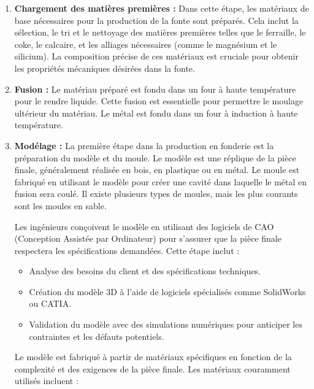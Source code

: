 \documentclass[12pt]{article}
\begin{document}
\begin{enumerate}
    \item \textbf{Chargement des matières premières :}
    Dans cette étape, les matériaux de base nécessaires pour la production de la 
    fonte sont préparés. Cela inclut la sélection, le tri et le nettoyage des 
    matières premières telles que le ferraille, le coke, le calcaire, et les alliages
    nécessaires (comme le magnésium et le silicium). La composition précise de ces 
    matériaux est cruciale pour obtenir les propriétés mécaniques désirées dans la 
    fonte.


    \item \textbf{Fusion :} Le matériau préparé est fondu dans un four à haute 
    température pour le rendre liquide. Cette fusion est essentielle pour permettre 
    le moulage ultérieur du matériau. Le métal est fondu dans un four à induction à 
    haute température. 



    \item \textbf{Modélage :} 
    La première étape dans la production en fonderie est la préparation du 
    modèle et du moule. Le modèle est une réplique de la pièce finale, 
    généralement réalisée en bois, en plastique ou en métal. 
    Le moule est fabriqué en utilisant le modèle pour créer une cavité 
    dans laquelle le métal en fusion sera coulé. Il existe plusieurs types 
    de moules, mais les plus courants sont les moules en sable.

    Les ingénieurs conçoivent le modèle en utilisant des logiciels de CAO 
(Conception Assistée par Ordinateur) pour s'assurer que la pièce finale 
respectera les spécifications demandées. Cette étape inclut :

\begin{itemize}
    \item Analyse des besoins du client et des spécifications techniques.
    \item Création du modèle 3D à l'aide de logiciels spécialisés comme SolidWorks ou CATIA.
    \item Validation du modèle avec des simulations numériques pour anticiper les contraintes et les défauts potentiels.
\end{itemize}


Le modèle est fabriqué à partir de matériaux spécifiques en fonction de 
la complexité et des exigences de la pièce finale. Les matériaux couramment 
utilisés incluent :


\end{enumerate}
\end{document}
